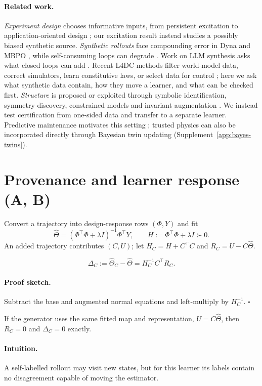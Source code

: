 \documentclass{l4dc2027}
\newcommand{\hTh}{\widehat\Theta}
\newcommand{\ProofSketch}{\paragraph{Proof sketch.}}
\newcommand{\Intuition}{\paragraph{Intuition.}}
\begin{document}
\paragraph{Related work.}
\emph{Experiment design} chooses informative inputs, from persistent excitation to application-oriented design \citep{ljung1999system,hjalmarsson2005experiment,gevers2005identification,bombois2006least,rojas2007robust,huan2024oed}; our excitation result instead studies a possibly biased synthetic source. \emph{Synthetic rollouts} face compounding error in Dyna and MBPO \citep{sutton1990dyna,janner2019mbpo}, while self-consuming loops can degrade \citep{shumailov2024collapse,alemohammad2024mad,dohmatob2024regression}. Work on LLM synthesis asks what closed loops can add \citep{li2026information,dale2026synthetic}. Recent L4DC methods filter world-model data, correct simulators, learn constitutive laws, or select data for control \citep{kim2026wombet,lanier2026redraw,patkar2026bgcl,naf2026choose}; here we ask what synthetic data contain, how they move a learner, and what can be checked first. \emph{Structure} is proposed or exploited through symbolic identification, symmetry discovery, constrained models and invariant augmentation \citep{brunton2016sindy,yang2023liegan,yang2024symmetry,calvobarles2025equivariance,tahmasebi2026adaptive,wang2021symmetry,valperga2022reversible,dao2019kernel,chen2020group,ordonez2023discrete,wang2022data,brandstetter2022lie}. We instead test certification from one-sided data and transfer to a separate learner. Predictive maintenance motivates this setting \citep{nieminen2026synthetic,wuttke2026digital}; trusted physics can also be incorporated directly through Bayesian twin updating \citep{kapteyn2021probabilistic} (Supplement~\ref{app:bayes-twins}).

\section{Provenance and learner response (A, B)}\label{sec:theory}
Convert a trajectory into design-response rows $(\Phi,Y)$ and fit
\begin{equation}\label{eq:ridge}
\hTh=(\Phi^\top\Phi+\lambda I)^{-1}\Phi^\top Y,\qquad H:=\Phi^\top\Phi+\lambda I\succ0.
\end{equation}
An added trajectory contributes $(C,U)$; let $H_C=H+C^\top C$ and $R_C=U-C\hTh$.

\begin{lemma}\label{lem:update}
\begin{equation}\label{eq:update}
\Delta_C:=\hTh_C-\hTh=H_C^{-1}C^\top R_C.
\end{equation}
\end{lemma}
\ProofSketch Subtract the base and augmented normal equations and left-multiply by $H_C^{-1}$. \hfill$\square$
\begin{corollary}\label{cor:self}
If the generator uses the same fitted map and representation, $U=C\hTh$, then $R_C=0$ and $\Delta_C=0$ exactly.
\end{corollary}
\Intuition A self-labelled rollout may visit new states, but for this learner its labels contain no disagreement capable of moving the estimator.
\end{document}
